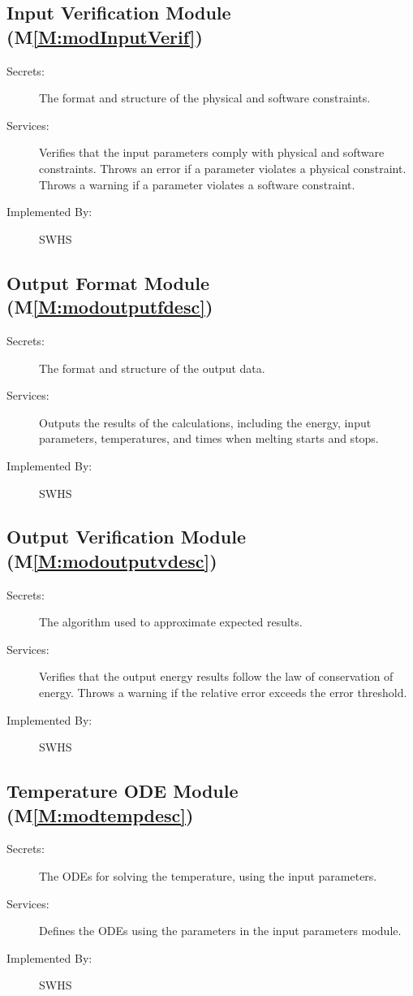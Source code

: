 \documentclass[12pt]{article}
\begin{document}
\subsection{Input Verification Module (M\ref{M:modInputVerif})}
\label{Sec:InpuVeriModu()}
\begin{description}
\item[Secrets:]The format and structure of the physical and software constraints.
\item[Services:]Verifies that the input parameters comply with physical and software constraints. Throws an error if a parameter violates a physical constraint. Throws a warning if a parameter violates a software constraint.
\item[Implemented By:]SWHS
\end{description}
\subsection{Output Format Module (M\ref{M:modoutputfdesc})}
\label{Sec:OutpFormModu()}
\begin{description}
\item[Secrets:]The format and structure of the output data.
\item[Services:]Outputs the results of the calculations, including the energy, input parameters, temperatures, and times when melting starts and stops.
\item[Implemented By:]SWHS
\end{description}
\subsection{Output Verification Module (M\ref{M:modoutputvdesc})}
\label{Sec:OutpVeriModu()}
\begin{description}
\item[Secrets:]The algorithm used to approximate expected results.
\item[Services:]Verifies that the output energy results follow the law of conservation of energy. Throws a warning if the relative error exceeds the error threshold.
\item[Implemented By:]SWHS
\end{description}
\subsection{Temperature ODE Module (M\ref{M:modtempdesc})}
\label{Sec:TempODEModu()}
\begin{description}
\item[Secrets:]The ODEs for solving the temperature, using the input parameters.
\item[Services:]Defines the ODEs using the parameters in the input parameters module.
\item[Implemented By:]SWHS
\end{description}
\end{document}
